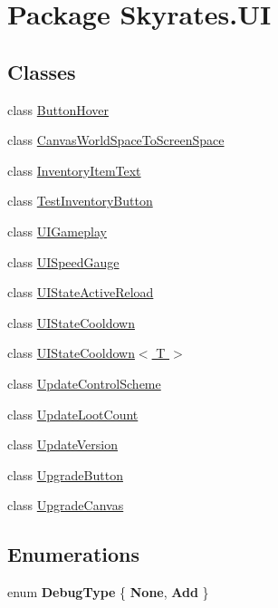 \hypertarget{namespace_skyrates_1_1_u_i}{\section{Package Skyrates.\-U\-I}
\label{namespace_skyrates_1_1_u_i}
}
\subsection*{Classes}
\begin{DoxyCompactItemize}
\item 
class \hyperlink{class_skyrates_1_1_u_i_1_1_button_hover}{Button\-Hover}
\item 
class \hyperlink{class_skyrates_1_1_u_i_1_1_canvas_world_space_to_screen_space}{Canvas\-World\-Space\-To\-Screen\-Space}
\item 
class \hyperlink{class_skyrates_1_1_u_i_1_1_inventory_item_text}{Inventory\-Item\-Text}
\item 
class \hyperlink{class_skyrates_1_1_u_i_1_1_test_inventory_button}{Test\-Inventory\-Button}
\item 
class \hyperlink{class_skyrates_1_1_u_i_1_1_u_i_gameplay}{U\-I\-Gameplay}
\item 
class \hyperlink{class_skyrates_1_1_u_i_1_1_u_i_speed_gauge}{U\-I\-Speed\-Gauge}
\item 
class \hyperlink{class_skyrates_1_1_u_i_1_1_u_i_state_active_reload}{U\-I\-State\-Active\-Reload}
\item 
class \hyperlink{class_skyrates_1_1_u_i_1_1_u_i_state_cooldown}{U\-I\-State\-Cooldown}
\item 
class \hyperlink{class_skyrates_1_1_u_i_1_1_u_i_state_cooldown_3_01_t_01_4}{U\-I\-State\-Cooldown$<$ T $>$}
\item 
class \hyperlink{class_skyrates_1_1_u_i_1_1_update_control_scheme}{Update\-Control\-Scheme}
\item 
class \hyperlink{class_skyrates_1_1_u_i_1_1_update_loot_count}{Update\-Loot\-Count}
\item 
class \hyperlink{class_skyrates_1_1_u_i_1_1_update_version}{Update\-Version}
\item 
class \hyperlink{class_skyrates_1_1_u_i_1_1_upgrade_button}{Upgrade\-Button}
\item 
class \hyperlink{class_skyrates_1_1_u_i_1_1_upgrade_canvas}{Upgrade\-Canvas}
\end{DoxyCompactItemize}
\subsection*{Enumerations}
\begin{DoxyCompactItemize}
\item 
enum {\bfseries Debug\-Type} \{ {\bfseries None}, 
{\bfseries Add}
 \}
\end{DoxyCompactItemize}
